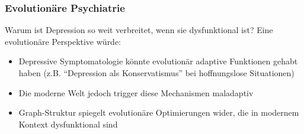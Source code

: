 \documentclass[a4paper,12pt]{article}
\theoremstyle{definition}
\begin{document}
\subsubsection{Evolutionäre Psychiatrie}

Warum ist Depression so weit verbreitet, wenn sie dysfunktional ist? Eine evolutionäre Perspektive würde:

\begin{itemize}
	\item Depressive Symptomatologie könnte evolutionär adaptive Funktionen gehabt haben (z.B. ``Depression als Konservatismus'' bei hoffnungslose Situationen)
	\item Die moderne Welt jedoch trigger diese Mechanismen maladaptiv
	\item Graph-Struktur spiegelt evolutionäre Optimierungen wider, die in modernem Kontext dysfunktional sind
\end{itemize}
\end{document}
